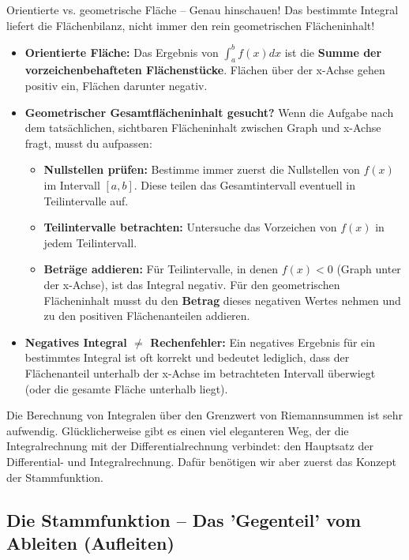\begin{fehlerboxumgebung}{Orientierte vs. geometrische Fläche – Genau hinschauen!}
Das bestimmte Integral liefert die Flächenbilanz, nicht immer den rein geometrischen Flächeninhalt!
\begin{itemize}
    \item \textbf{Orientierte Fläche:} Das Ergebnis von $\int_a^b f(x)dx$ ist die \textbf{Summe der vorzeichenbehafteten Flächenstücke}. Flächen über der x-Achse gehen positiv ein, Flächen darunter negativ.
    \item \textbf{Geometrischer Gesamtflächeninhalt gesucht?} Wenn die Aufgabe nach dem tatsächlichen, sichtbaren Flächeninhalt zwischen Graph und x-Achse fragt, musst du aufpassen:
    \begin{itemize}
        \item \textbf{Nullstellen prüfen:} Bestimme immer zuerst die Nullstellen von $f(x)$ im Intervall $[a,b]$. Diese teilen das Gesamtintervall eventuell in Teilintervalle auf.
        \item \textbf{Teilintervalle betrachten:} Untersuche das Vorzeichen von $f(x)$ in jedem Teilintervall.
        \item \textbf{Beträge addieren:} Für Teilintervalle, in denen $f(x) < 0$ (Graph unter der x-Achse), ist das Integral negativ. Für den geometrischen Flächeninhalt musst du den \textbf{Betrag} dieses negativen Wertes nehmen und zu den positiven Flächenanteilen addieren.
    \end{itemize}
    \item \textbf{Negatives Integral $\neq$ Rechenfehler:} Ein negatives Ergebnis für ein bestimmtes Integral ist oft korrekt und bedeutet lediglich, dass der Flächenanteil unterhalb der x-Achse im betrachteten Intervall überwiegt (oder die gesamte Fläche unterhalb liegt).
\end{itemize}
\end{fehlerboxumgebung}

Die Berechnung von Integralen über den Grenzwert von Riemannsummen ist sehr aufwendig. Glücklicherweise gibt es einen viel eleganteren Weg, der die Integralrechnung mit der Differentialrechnung verbindet: den Hauptsatz der Differential- und Integralrechnung. Dafür benötigen wir aber zuerst das Konzept der Stammfunktion.

\subsection{Die Stammfunktion – Das 'Gegenteil' vom Ableiten (Aufleiten)}
\label{subsec:stammfunktion_integral} %

